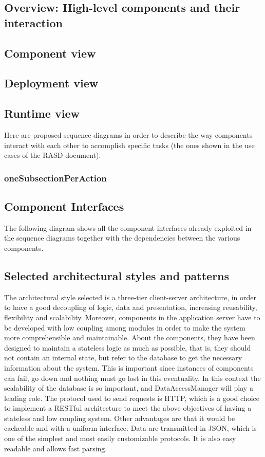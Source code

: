 \subsection{Overview: High-level components and their interaction}

\subsection{Component view}

\subsection{Deployment view}

\subsection{Runtime view}
Here are proposed sequence diagrams in order to describe the way components interact with each other to accomplish specific tasks (the ones shown in the use cases of the RASD document).
\subsubsection{oneSubsectionPerAction}

\subsection{Component Interfaces}
The following diagram shows all the component interfaces already exploited in the sequence diagrams together with the dependencies between the various components. 

\subsection{Selected architectural styles and patterns}
The architectural style selected is a three-tier client-server architecture, in order to have a good decoupling of logic, data and presentation, increasing reusability, flexibility and scalability. Moreover, components in the application server have to be developed with low coupling among modules in order to make the system more comprehensible and maintainable. About the components, they have been designed to maintain a stateless logic as much as possible, that is, they should not contain an internal state, but refer to the database to get the necessary information about the system. This is important since instances of components can fail, go down and nothing must go lost in this eventuality. In this context the scalability of the database is so important, and DataAccessManager will play a leading role. 
The protocol used to send requests is HTTP, which is a good choice to implement a RESTful architecture to meet the above objectives of having a stateless and low coupling system. Other advantages are that it would be cacheable and with a uniform interface.
Data are transmitted in JSON, which is one of the simplest and most easily customizable protocols. It is also easy readable and allows fast parsing.\\

